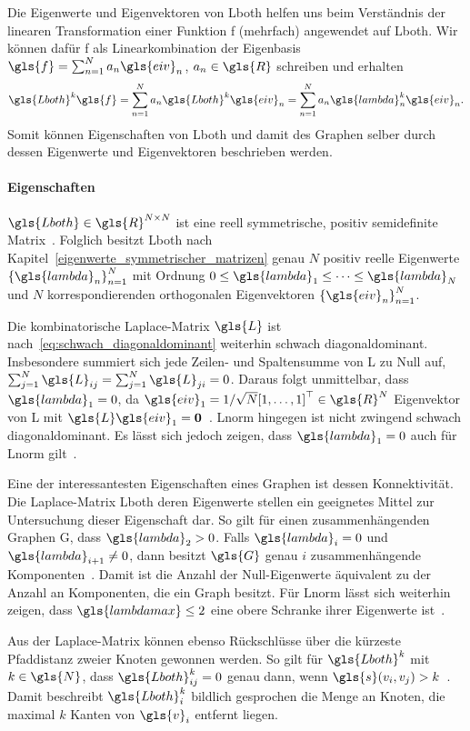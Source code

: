 Die Eigenwerte und Eigenvektoren von \gls{Lboth} helfen uns beim Verständnis der linearen Transformation einer Funktion \gls{f} (mehrfach) angewendet auf \gls{Lboth}.
Wir können dafür \gls{f} als Linearkombination der Eigenbasis $\gls{f} = \sum_{n=1}^N a_n \gls{eiv}_n$, $a_n \in \gls{R}$ schreiben und erhalten
\begin{equation*}
  \gls{Lboth}^k \gls{f} = \sum_{n=1}^N a_n \gls{Lboth}^k \gls{eiv}_n = \sum_{n=1}^N a_n \gls{lambda}_n^k \gls{eiv}_n.
\end{equation*}
Somit können Eigenschaften von \gls{Lboth} und damit des Graphen selber durch dessen Eigenwerte und Eigenvektoren beschrieben werden.

\paragraph{Eigenschaften}
\label{laplace_eigenschaften}

$\gls{Lboth} \in \gls{R}^{N \times N}$ ist eine reell symmetrische, positiv semidefinite Matrix~\cite{Chung}.
Folglich besitzt \gls{Lboth} nach Kapitel~\ref{eigenwerte_symmetrischer_matrizen} genau $N$ positiv reelle Eigenwerte ${\left\{\gls{lambda}_n\right\}}_{n=1}^N$ mit Ordnung $0 \leq \gls{lambda}_1 \leq \cdots \leq \gls{lambda}_N$ und $N$ korrespondierenden orthogonalen Eigenvektoren ${\left\{\gls{eiv}_n\right\}}_{n=1}^N$.

Die kombinatorische Laplace-Matrix $\gls{L}$ ist nach~\eqref{eq:schwach_diagonaldominant} weiterhin schwach diagonaldominant.
Insbesondere summiert sich jede Zeilen- und Spaltensumme von \gls{L} zu Null auf, \dhe{} $\sum_{j=1}^N \gls{L}_{ij} = \sum_{j=1}^N \gls{L}_{ji} = 0$.
Daraus folgt unmittelbar, dass $\gls{lambda}_1 = 0$, da $\gls{eiv}_1 = 1/\sqrt{N}{\left[1, \ldots, 1\right]}^{\top} \in \gls{R}^N$ Eigenvektor von \gls{L} mit $\gls{L}\gls{eiv}_1 = \ve{0}$~\cite{Shuman}.
\gls{Lnorm} hingegen ist nicht zwingend schwach diagonaldominant.
Es lässt sich jedoch zeigen, dass $\gls{lambda}_1 = 0$ auch für \gls{Lnorm} gilt~\cite{Chung}.

Eine der interessantesten Eigenschaften eines Graphen ist dessen Konnektivität.
Die Laplace-Matrix \gls{Lboth} \bzw{} deren Eigenwerte stellen ein geeignetes Mittel zur Untersuchung dieser Eigenschaft dar.
So gilt \bspw{} für einen zusammenhängenden Graphen \gls{G}, dass $\gls{lambda}_2 > 0$.
Falls $\gls{lambda}_i = 0$ und $\gls{lambda}_{i+1} \neq 0$, dann besitzt $\gls{G}$ genau $i$ zusammenhängende Komponenten~\cite{Chung}.
Damit ist die Anzahl der Null-Eigenwerte äquivalent zu der Anzahl an Komponenten, die ein Graph besitzt.
Für \gls{Lnorm} lässt sich weiterhin zeigen, dass $\gls{lambdamax} \leq 2$ eine obere Schranke ihrer Eigenwerte ist~\cite{Chung}.

Aus der Laplace-Matrix können ebenso Rückschlüsse über die kürzeste Pfaddistanz zweier Knoten gewonnen werden.
So gilt für $\gls{Lboth}^{k}$ mit $k \in \gls{N}$, dass $\gls{Lboth}^k_{ij} = 0$ genau dann, wenn $\gls{s}\left(v_i, v_j\right) > k$~\cite{Hammond}.
Damit beschreibt $\gls{Lboth}^k_i$ bildlich gesprochen die Menge an Knoten, die maximal $k$ Kanten von $\gls{v}_i$ entfernt liegen.
